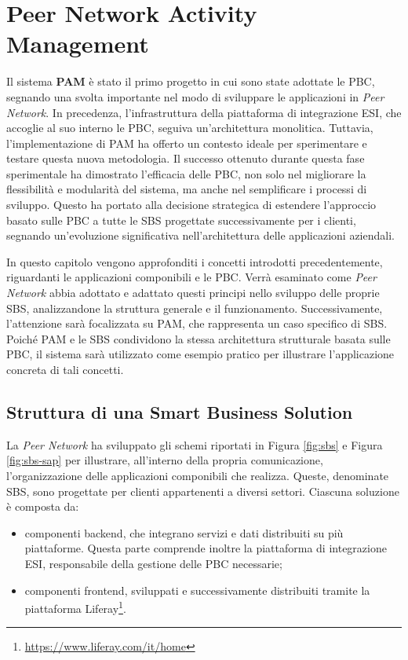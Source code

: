 \chapter{Peer Network Activity Management}
\label{chap:pam}

Il sistema \textbf{\ac{PAM}} è stato il primo progetto in cui sono state
adottate le \ac{PBC}, segnando una svolta importante nel modo di sviluppare le applicazioni in \textit{Peer Network}.
In precedenza, l’infrastruttura della piattaforma di integrazione \ac{ESI}, che accoglie al suo interno
le \ac{PBC}, seguiva un’architettura monolitica. Tuttavia, l’implementazione di \ac{PAM} ha offerto un contesto
ideale per sperimentare e testare questa nuova metodologia. Il successo ottenuto
durante questa fase sperimentale ha dimostrato l’efficacia delle \ac{PBC}, non solo nel migliorare la
flessibilità e modularità del sistema, ma anche nel semplificare i processi di sviluppo. Questo ha
portato alla decisione strategica di estendere l’approccio basato sulle \ac{PBC} a tutte le
\ac{SBS} progettate successivamente per i clienti, segnando un’evoluzione
significativa nell’architettura delle applicazioni aziendali.

In questo capitolo vengono approfonditi i concetti introdotti precedentemente, riguardanti
le applicazioni componibili e le \ac{PBC}. Verrà esaminato come \textit{Peer Network} abbia
adottato e adattato questi principi nello sviluppo delle proprie \ac{SBS}, analizzandone la struttura
generale e il funzionamento. Successivamente, l’attenzione sarà focalizzata su \ac{PAM}, che rappresenta un
caso specifico di \ac{SBS}. Poiché \ac{PAM} e le \ac{SBS} condividono la stessa architettura strutturale basata sulle
\ac{PBC}, il sistema sarà utilizzato come esempio pratico per illustrare l’applicazione concreta di tali
concetti.

\section{Struttura di una Smart Business Solution}
La \textit{Peer Network} ha sviluppato gli schemi riportati in Figura \ref{fig:sbs} e Figura \ref{fig:sbs-sap}
per illustrare, all'interno della propria comunicazione, l’organizzazione delle applicazioni componibili che realizza.
Queste, denominate \ac{SBS}, sono progettate per clienti appartenenti a diversi settori.
Ciascuna soluzione è composta da:
\begin{itemize}
    \item componenti backend, che integrano servizi e dati distribuiti su più piattaforme. Questa parte
    comprende inoltre la piattaforma di integrazione \ac{ESI}, responsabile della gestione delle \ac{PBC}
    necessarie;
    \item componenti frontend, sviluppati e successivamente distribuiti tramite la piattaforma Liferay\footnote{\url{https://www.liferay.com/it/home}}.
\end{itemize}

